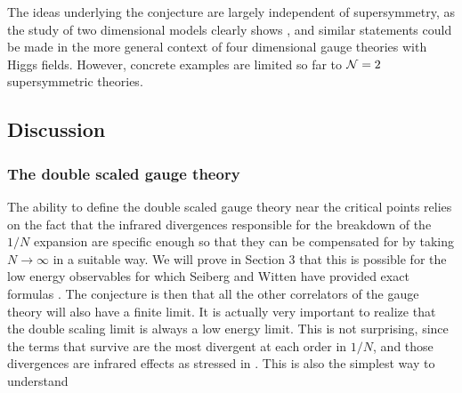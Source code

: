 \documentclass[a4paper,12pt]{article}
\begin{document}
The ideas underlying
the conjecture are largely independent of supersymmetry, as the study of
two dimensional models clearly shows \cite{fer2}, and
similar statements could be made in the more general
context of four dimensional gauge theories with Higgs fields.
However, concrete examples are limited so far to ${\cal N}=2$ 
supersymmetric theories.


%
\subsection{Discussion}
%
\subsubsection{The double scaled gauge theory}
%
The ability to define the double scaled gauge theory near the critical 
points relies on the fact that the infrared divergences responsible for 
the breakdown of the $1/N$ expansion \cite{fer}
are specific enough so that they can
be compensated for by taking $N\rightarrow\infty$ in a suitable way. 
We will prove in Section 3 that this is possible for the low energy
observables for which Seiberg and Witten have provided
exact formulas \cite{SW}. The conjecture is then that all the other
correlators of the gauge theory will also have a finite limit. It is 
actually very important to realize that the double scaling limit is
always a low energy limit. This is not surprising, since the
terms that survive are the most divergent at
each order in $1/N$, and those divergences are infrared effects as
stressed in \cite{fer}. This is also the simplest way to understand 
\end{document}
